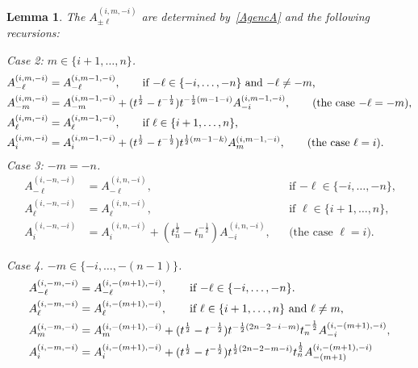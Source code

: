 \documentclass[11pt]{article}
\theoremstyle{plain}
\newtheorem{lemma}[thm]{Lemma}
\theoremstyle{definition}
\theoremstyle{remark}
\numberwithin{equation}{section}
\newcounter{r}
\newcounter{s}
\begin{document}
\begin{lemma} \label{Arec}
The $A^{(i,m,-i)}_{\pm \ell}$ are determined by~\eqref{AgencA} and the following recursions:

\noindent 
Case 2: $m\in \{i+1, \ldots, n\}$.
\begin{align}
A^{(i,m,-i)}_{-\ell} &= A^{(i,m-1,-i)}_{-\ell}, \qquad \text{if $-\ell\in \{-i, \ldots, -n\}$ and $-\ell\ne -m$,} \nonumber
\\
A^{(i,m,-i)}_{-m} &= A^{(i,m-1,-i)}_{-m} + (t^{\frac12}-t^{-\frac12})t^{-\frac12(m-1-i)} A^{(i,m-1,-i)}_{-i},\qquad \hbox{(the case $-\ell = -m$),}
\nonumber
\\
A^{(i,m,-i)}_{\ell} &= A^{(i,m-1,-i)}_{\ell}, \qquad\text{if $\ell\in \{i+1, \ldots, n\}$,}
\label{Agenr2}
\\
A^{(i,m,-i)}_i &= A^{(i,m-1,-i)}_i +  (t^{\frac12}-t^{-\frac12})t^{\frac12(m-1-k)} A^{(i,m-1,-i)}_m,  \qquad \text{(the case $\ell= i$).} \nonumber
\end{align}
Case 3: $-m=-n$.
\begin{align}
A^{(i,-n,-i)}_{-\ell} &= A^{(i,n,-i)}_{-\ell}, && \text{if $-\ell \in \{-i, \ldots, -n\}$,}\nonumber
\\
A^{(i,-n,-i)}_{\ell} &= A^{(i,n,-i)}_{\ell}, && \text{if $\ell\in \{i+1, \ldots, n\}$,}\nonumber
\\
A^{(i,-n,-i)}_i &= A^{(i,n,-i)}_i + (t_n^{\frac12}-t_n^{-\frac12}) A^{(i,n,-i)}_{-i},  && \text{(the case $\ell= i$).}
\label{Agenr3}
\end{align}

Case 4. $-m\in \{-i, \ldots, -(n-1)\}$.
\begin{align}
A^{(i,-m,-i)}_{-\ell} &= A^{(i, -(m+1),-i)}_{-\ell},\qquad\hbox{if $-\ell\in \{-i, \ldots, -n\}$.} \nonumber \\
A^{(i,-m,-i)}_\ell &= A^{(i, -(m+1),-i)}_\ell,\qquad\hbox{if $\ell\in \{i+1, \ldots, n\}$ and $\ell\neq m$,} \nonumber
\\
A^{(i,-m,-i)}_{m} 
&= A^{(i,-(m+1),-i)}_{m}+(t^{\frac12}-t^{-\frac12})t^{-\frac12(2n-2-i-m)}t_n^{-\frac12} A^{(i,-(m+1),-i)}_{-i}, \nonumber
\\
A^{(i,-m,-i)}_i
&= A^{(i,-(m+1),-i)}_i+(t^{\frac12}-t^{-\frac12})t^{\frac12(2n-2-m-i)}t_n^{\frac12}
A^{(i,-(m+1),-i)}_{-(m+1)}
\label{Agenr4}
\end{align}
\end{lemma}
\end{document}
